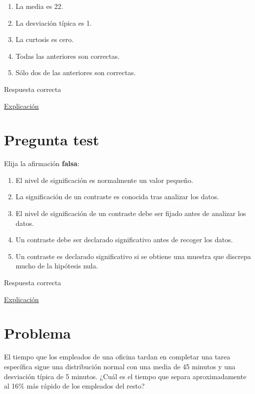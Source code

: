 \documentclass[
]{book}
\providecommand{\tightlist}{%
  \setlength{\itemsep}{0pt}\setlength{\parskip}{0pt}}
\begin{document}
\begin{enumerate}
\def\labelenumi{\alph{enumi})}
\tightlist
\item
  La media es 22.
\item
  La desviación típica es 1.
\item
  La curtosis es cero.
\item
  Todas las anteriores son correctas.
\item
  Sólo dos de las anteriores son correctas.
\end{enumerate}

Respuesta correcta

\href{https://1fjmanzano.github.io/bioestadistica/distribuciones-de-probabilidad.html\#distribucio\%CC\%81n-normal}{Explicación}

\hypertarget{pregunta-test-114}{%
\section{Pregunta test}\label{pregunta-test-114}}

Elija la afirmación \textbf{falsa}:

\begin{enumerate}
\def\labelenumi{\alph{enumi})}
\tightlist
\item
  El nivel de significación es normalmente un valor pequeño.
\item
  La significación de un contraste es conocida tras analizar los datos.
\item
  El nivel de significación de un contraste debe ser fijado antes de analizar los datos.
\item
  Un contraste debe ser declarado significativo antes de recoger los datos.
\item
  Un contraste es declarado significativo si se obtiene una muestra que discrepa mucho de la hipótesis nula.
\end{enumerate}

Respuesta correcta

\href{https://1fjmanzano.github.io/bioestadistica/contrastes-de-hipo\%CC\%81tesis.html}{Explicación}

\hypertarget{problema-14}{%
\section{Problema}\label{problema-14}}

El tiempo que los empleados de una oficina tardan en completar una tarea específica sigue una distribución normal con una media de 45 minutos y una desviación típica de 5 minutos. ¿Cuál es el tiempo que separa aproximadamente al 16\% más rápido de los empleados del resto?
\end{document}
